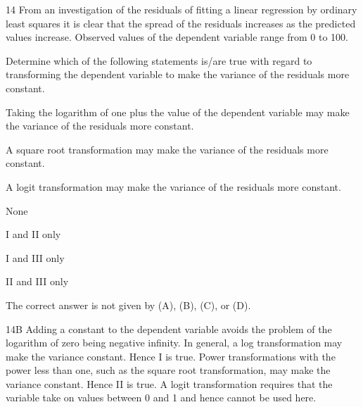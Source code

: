 \begin{question}{14}
From an investigation of the residuals of fitting a linear regression by ordinary least squares it is clear that the spread of the residuals increases as the predicted values increase. Observed values of the dependent variable range from 0 to 100.

Determine which of the following statements is/are true with regard to transforming the dependent variable to make the variance of the residuals more constant.
\begin{statements}
\item Taking the logarithm of one plus the value of the dependent variable may make the variance of the residuals more constant.
\item A square root transformation may make the variance of the residuals more constant.
\item A logit transformation may make the variance of the residuals more constant.
\end{statements}

\begin{choices}
\item None
\item I and II only
\item I and III only
\item II and III only
\item The correct answer is not given by (A), (B), (C), or (D).
\end{choices}
\end{question}
\begin{solution}{14}{B}
Adding a constant to the dependent variable avoids the problem of the logarithm of zero being negative infinity. In general, a log transformation may make the variance constant. Hence I is true. Power transformations with the power less than one, such as the square root transformation, may make the variance constant. Hence II is true. A logit transformation requires that the variable take on values between 0 and 1 and hence cannot be used here.
\end{solution}

